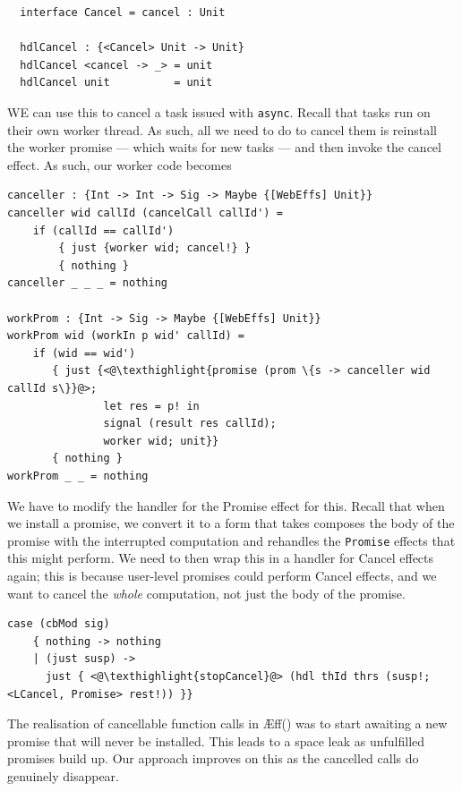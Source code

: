 \documentclass[msc,deptreport,cs]{infthesis} %
\newcommand{\code}[1]{\lstinline{#1}}
\newcommand{\texthighlight}[1]{%
  \colorbox{red!20}{#1}}
\newcommand\aeff{{\AE}ff\xspace}
\begin{document}
\begin{lstlisting}
  interface Cancel = cancel : Unit
 
  hdlCancel : {<Cancel> Unit -> Unit}
  hdlCancel <cancel -> _> = unit
  hdlCancel unit          = unit
\end{lstlisting}


WE can use this to cancel a task issued with \code{async}. Recall that tasks run
on their own worker thread. As such, all we need to do to cancel them is
reinstall the worker promise --- which waits for new tasks --- and then invoke
the cancel effect. As such, our worker code becomes

\begin{lstlisting}
canceller : {Int -> Int -> Sig -> Maybe {[WebEffs] Unit}}
canceller wid callId (cancelCall callId') =
    if (callId == callId')
        { just {worker wid; cancel!} }
        { nothing }
canceller _ _ _ = nothing

workProm : {Int -> Sig -> Maybe {[WebEffs] Unit}}
workProm wid (workIn p wid' callId) =
    if (wid == wid')
       { just {<@\texthighlight{promise (prom \{s -> canceller wid callId s\}}@>;
               let res = p! in
               signal (result res callId);
               worker wid; unit}}
       { nothing }
workProm _ _ = nothing
\end{lstlisting}

We have to modify the handler for the \textsf{Promise} effect for this. Recall
that when we install a promise, we convert it to a form that takes composes the
body of the promise with the interrupted computation and rehandles the
\code{Promise} effects that this might perform. We need to then wrap this in a
handler for \textsf{Cancel} effects again; this is because user-level promises
could perform \textsf{Cancel} effects, and we want to cancel the \emph{whole}
computation, not just the body of the promise.

\begin{lstlisting}
case (cbMod sig)
    { nothing -> nothing
    | (just susp) ->
      just { <@\texthighlight{stopCancel}@> (hdl thId thrs (susp!; <LCancel, Promise> rest!)) }}
\end{lstlisting}

The realisation of cancellable function calls in
\aeff(\cite{ahman2020asynchronous}) was to start awaiting a new promise that
will never be installed. This leads to a space leak as unfulfilled promises
build up. Our approach improves on this as the cancelled calls do genuinely
disappear.
\end{document}
